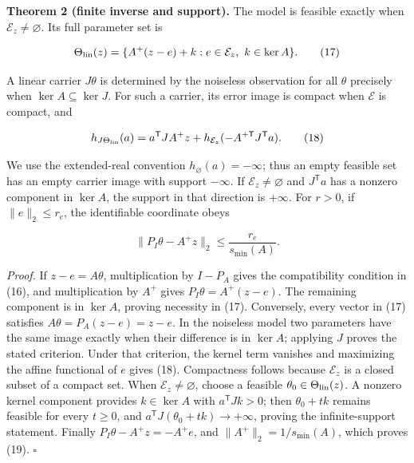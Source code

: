\documentclass[aps,prd,reprint,onecolumn,11pt,nofootinbib,notitlepage]{revtex4-2}
\begin{document}
\textbf{Theorem 2 (finite inverse and support).} The model is feasible exactly when \(\mathcal E_z\ne\varnothing\). Its full parameter set is

\begin{equation}
 \Theta_{\rm lin}(z)=
 \{A^+(z-e)+k:e\in\mathcal E_z,\ k\in\ker A\}.\tag{17}
\end{equation}

A linear carrier \(J\theta\) is determined by the noiseless observation for all \(\theta\) precisely when \(\ker A\subseteq\ker J\). For such a carrier, its error image is compact when \(\mathcal E\) is compact, and

\begin{equation}
 h_{J\Theta_{\rm lin}}(a)
 =a^{\mathsf T}JA^+z+
 h_{\mathcal E_z}(-A^{+\mathsf T}J^{\mathsf T}a).\tag{18}
\end{equation}

We use the extended-real convention \(h_{\varnothing}(a)=-\infty\); thus an empty feasible set has an empty carrier image with support \(-\infty\). If \(\mathcal E_z\ne\varnothing\) and \(J^{\mathsf T}a\) has a nonzero component in \(\ker A\), the support in that direction is \(+\infty\). For \(r>0\), if \(\|e\|_2\le r_e\), the identifiable coordinate obeys

\begin{equation}
 \|P_I\theta-A^+z\|_2\le\frac{r_e}{s_{\min}(A)} .\tag{19}
\end{equation}

\textit{Proof.} If \(z-e=A\theta\), multiplication by \(I-P_A\) gives the compatibility condition in (16), and multiplication by \(A^+\) gives \(P_I\theta=A^+(z-e)\). The remaining component is in \(\ker A\), proving necessity in (17). Conversely, every vector in (17) satisfies \(A\theta=P_A(z-e)=z-e\). In the noiseless model two parameters have the same image exactly when their difference is in \(\ker A\); applying \(J\) proves the stated criterion. Under that criterion, the kernel term vanishes and maximizing the affine functional of \(e\) gives (18). Compactness follows because \(\mathcal E_z\) is a closed subset of a compact set. When \(\mathcal E_z\ne\varnothing\), choose a feasible \(\theta_0\in\Theta_{\rm lin}(z)\). A nonzero kernel component provides \(k\in\ker A\) with \(a^{\mathsf T}Jk>0\); then \(\theta_0+tk\) remains feasible for every \(t\ge0\), and \(a^{\mathsf T}J(\theta_0+tk)\to+\infty\), proving the infinite-support statement. Finally \(P_I\theta-A^+z=-A^+e\), and \(\|A^+\|_2=1/s_{\min}(A)\), which proves (19). \(\square\)
\end{document}
